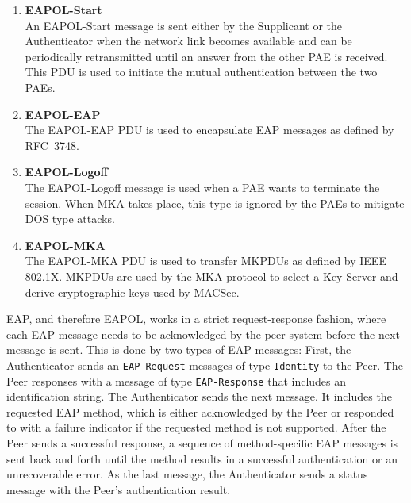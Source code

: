 \begin{enumerate}[itemsep=0pt]
    \item \textbf{\ac{EAPOL}-Start}\\
    An \ac{EAPOL}-Start message is sent either by the Supplicant or the Authenticator when the network link becomes available and can be periodically retransmitted until an answer from the other \ac{PAE} is received. This PDU is used to initiate the mutual authentication between the two \acp{PAE}.
    \item \textbf{\ac{EAPOL}-EAP}\\
    The \ac{EAPOL}-EAP \ac{PDU} is used to encapsulate \ac{EAP} messages as defined by RFC~3748. 
    \item \textbf{\ac{EAPOL}-Logoff}\\
    The \ac{EAPOL}-Logoff message is used when a \ac{PAE} wants to terminate the session. When MKA takes place, this type is ignored by the \acp{PAE} to mitigate DOS type attacks.
    \item \textbf{\ac{EAPOL}-MKA}\\
    The \ac{EAPOL}-MKA \ac{PDU} is used to transfer MK\acp{PDU} as defined by IEEE 802.1X. MK\acp{PDU} are used by the \ac{MKA} protocol to select a Key Server and derive cryptographic keys used by MACSec.
\end{enumerate}

EAP, and therefore EAPOL, works in a strict request-response fashion, where each EAP message needs to be acknowledged by the peer system before the next message is sent. This is done by two types of EAP messages: First, the Authenticator sends an \texttt{EAP-Request} messages of type \texttt{Identity} to the Peer. The Peer responses with a message of type \texttt{EAP-Response} that includes an identification string. The Authenticator sends the next message. It includes the requested \ac{EAP} method, which is either acknowledged by the Peer or responded to with a failure indicator if the requested method is not supported. After the Peer sends a successful response, a sequence of method-specific EAP messages is sent back and forth until the method results in a successful authentication or an unrecoverable error. As the last message, the Authenticator sends a status message with the Peer's authentication result.

